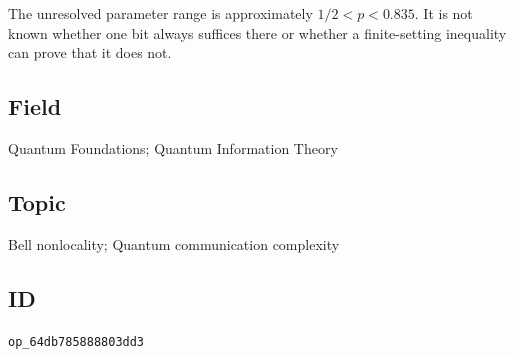 The unresolved parameter range is approximately $1/2<p<0.835$.  It is not
known whether one bit always suffices there or whether a finite-setting
inequality can prove that it does not.

\subsection*{Field}

Quantum Foundations; Quantum Information Theory

\subsection*{Topic}

Bell nonlocality; Quantum communication complexity

\subsection*{ID}

\texttt{op\_64db785888803dd3}
